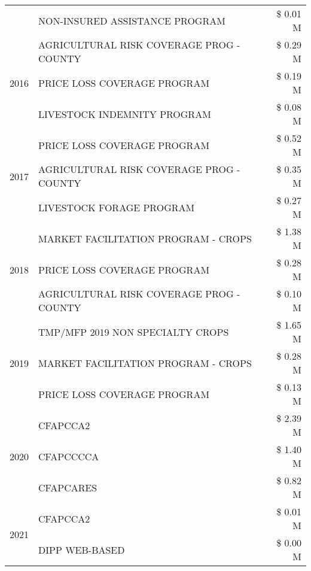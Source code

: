 \begin{tabular}{llr}
 & NON-INSURED ASSISTANCE PROGRAM & \$ 0.01 M \\
\cline{1-3}
\multirow[t]{3}{*}{2016} & AGRICULTURAL RISK COVERAGE PROG - COUNTY & \$ 0.29 M \\
 & PRICE LOSS COVERAGE PROGRAM & \$ 0.19 M \\
 & LIVESTOCK INDEMNITY PROGRAM & \$ 0.08 M \\
\cline{1-3}
\multirow[t]{3}{*}{2017} & PRICE LOSS COVERAGE PROGRAM & \$ 0.52 M \\
 & AGRICULTURAL RISK COVERAGE PROG - COUNTY & \$ 0.35 M \\
 & LIVESTOCK FORAGE PROGRAM & \$ 0.27 M \\
\cline{1-3}
\multirow[t]{3}{*}{2018} & MARKET FACILITATION PROGRAM - CROPS & \$ 1.38 M \\
 & PRICE LOSS COVERAGE PROGRAM & \$ 0.28 M \\
 & AGRICULTURAL RISK COVERAGE PROG - COUNTY & \$ 0.10 M \\
\cline{1-3}
\multirow[t]{3}{*}{2019} & TMP/MFP 2019 NON SPECIALTY CROPS & \$ 1.65 M \\
 & MARKET FACILITATION PROGRAM - CROPS & \$ 0.28 M \\
 & PRICE LOSS COVERAGE PROGRAM & \$ 0.13 M \\
\cline{1-3}
\multirow[t]{3}{*}{2020} & CFAPCCA2 & \$ 2.39 M \\
 & CFAPCCCCA & \$ 1.40 M \\
 & CFAPCARES & \$ 0.82 M \\
\cline{1-3}
\multirow[t]{2}{*}{2021} & CFAPCCA2 & \$ 0.01 M \\
 & DIPP WEB-BASED & \$ 0.00 M \\
\cline{1-3}
\bottomrule
\end{tabular}
